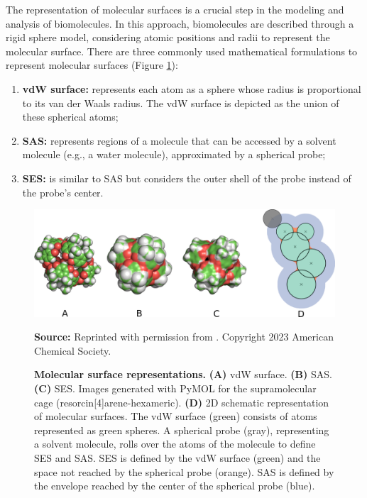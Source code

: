 \documentclass[Ingles]{phdthesis}
\begin{document}
The representation of molecular surfaces is a crucial step in the modeling and analysis of biomolecules. In this approach, biomolecules are described through a rigid sphere model, considering atomic positions and radii to represent the molecular surface. There are three commonly used mathematical formulations to represent molecular surfaces (Figure \ref{fig:surface-representation}):

\begin{enumerate}[label=\textbf{(\Alph*)}]
  \item \textbf{vdW surface:} represents each atom as a sphere whose radius is proportional to its van der Waals radius. The vdW surface is depicted as the union of these spherical atoms;
  \item \textbf{SAS:} represents regions of a molecule that can be accessed by a solvent molecule (e.g., a water molecule), approximated by a spherical probe;
  \item \textbf{SES:} is similar to SAS but considers the outer shell of the probe instead of the probe's center.
\end{enumerate}
  
\begin{figure}[H]
  \centerline{\includegraphics[scale=0.9]{images/surface-representation.png}}
  \centerline{\tiny{\textbf{Source:} Reprinted with permission from \cite{guerra2023B}. Copyright 2023 American Chemical Society.}}
  \caption[Molecular surface representations]{\textbf{Molecular surface representations.} \textbf{(A)} vdW surface. \textbf{(B)} SAS. \textbf{(C)} SES. Images generated with PyMOL for the supramolecular cage (resorcin[4]arene-hexameric). \textbf{(D)} 2D schematic representation of molecular surfaces. The vdW surface (green) consists of atoms represented as green spheres. A spherical probe (gray), representing a solvent molecule, rolls over the atoms of the molecule to define SES and SAS. SES is defined by the vdW surface (green) and the space not reached by the spherical probe (orange). SAS is defined by the envelope reached by the center of the spherical probe (blue).}
  \label{fig:surface-representation}
\end{figure}
\end{document}
